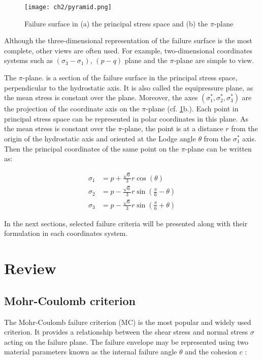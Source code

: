 \begin{figure}[tb]
    \centering
    \texttt{[image: ch2/pyramid.png]}
    \caption{Failure surface in (a) the principal stress space and (b) the $\pi$-plane \cite[Labuz 2018]{Labuz2018}}
    \label{fig2:pyramid}
\end{figure}

Although the three-dimensional representation of the failure surface is the most complete, other views are often used. For example, two-dimensional coordinates systems such as $(\sigma_3 -\sigma_1)$, $(p-q)$ plane and the $\pi$-plane are simple to view.  

The $\pi$-plane. is a section of the failure surface in the principal stress space, perpendicular to the hydrostatic axis. It is also called the equipressure plane, as the mean stress is constant over the plane. Moreover, the axes $(\sigma_1^*,\sigma_2^*,\sigma_3^*)$ are the projection of the coordinate axis on the $\pi$-plane (cf. \ref{fig2:pyramid}b.). Each point in principal stress space can be represented in polar coordinates in this plane. As the mean stress is constant over the $\pi$-plane, the point is at a distance $r$ from the origin of the hydrostatic axis and oriented at the Lodge angle $\theta$ from the  $\sigma_1^*$ axis. Then the principal coordinates of the same point on the $\pi$-plane can be written as: 

\begin{align}
    \sigma_1 &= p + \frac{\sqrt{6}}{3}r\cos\left(\theta\right) \label{eq2:sig1}\\
    \sigma_2 &= p - \frac{\sqrt{6}}{3}r\sin\left(\frac{\pi}{6}-\theta\right)\\
    \sigma_3 &= p - \frac{\sqrt{6}}{3}r\sin\left(\frac{\pi}{6}+\theta\right) \label{eq2:sig3}
\end{align}

In the next sections, selected failure criteria will be presented along with their formulation in each coordinates system. 

\section{Review}
\subsection{Mohr-Coulomb criterion}

The Mohr-Coulomb failure criterion (MC) is the most popular and widely used criterion. It provides a relationship between the shear stress and normal stress $\sigma$ acting on the failure plane. The failure envelope may be represented using two material parameters known as the internal failure angle $\theta$ and the cohesion $c$ :

